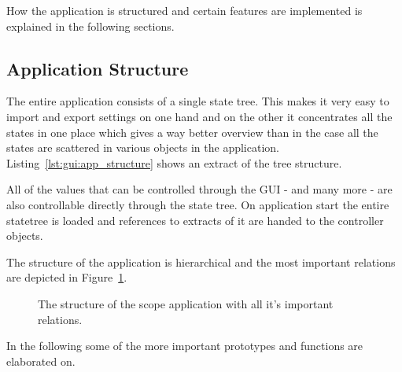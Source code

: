 How the application is structured and certain features are implemented is explained in the following sections.

%
%

\subsection{Application Structure}

The entire application consists of a single state tree. This makes it very easy to import and export settings on one hand and on the other it concentrates all the states in one place which gives a way better overview than in the case all the states are scattered in various objects in the application.
Listing~\ref{lst:gui:app_structure} shows an extract of the tree structure.


All of the values that can be controlled through the GUI - and many more - are also controllable directly through the state tree.
On application start the entire statetree is loaded and references to extracts of it are handed to the controller objects.

The structure of the application is hierarchical and the most important relations are depicted in Figure~\ref{fig:gui:structure}.

\begin{figure}
    \centering
    
    \caption[The scope structure]{%
        The structure of the scope application with all it's important relations.%
    }
    \label{fig:gui:structure}
\end{figure}

In the following some of the more important prototypes and functions are elaborated on.

%
%

